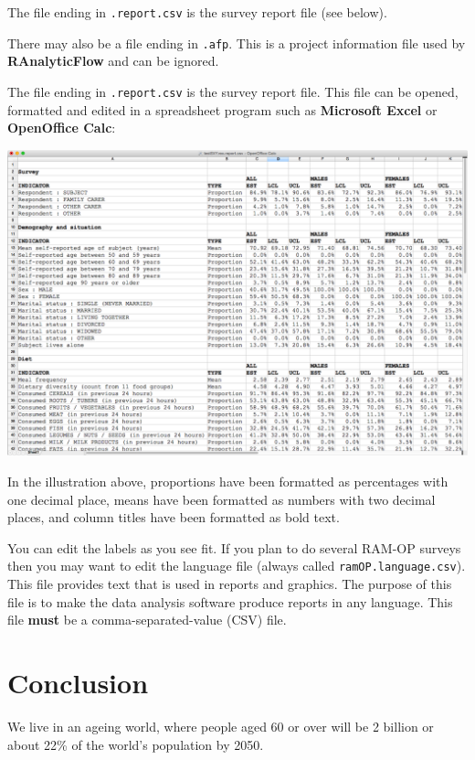 \documentclass[12pt,a4paper]{book}
\theoremstyle{definition}
\theoremstyle{definition}
\theoremstyle{definition}
\theoremstyle{remark}
\begin{document}
The file ending in \texttt{.report.csv} is the survey report file (see
below).

There may also be a file ending in \texttt{.afp}. This is a project
information file used by \textbf{RAnalyticFlow} and can be ignored.

The file ending in \texttt{.report.csv} is the survey report file. This
file can be opened, formatted and edited in a spreadsheet program such
as \textbf{Microsoft Excel} or \textbf{OpenOffice Calc}:

\begin{center}\includegraphics{figures/reportFile} \end{center}

In the illustration above, proportions have been formatted as
percentages with one decimal place, means have been formatted as numbers
with two decimal places, and column titles have been formatted as bold
text.

You can edit the labels as you see fit. If you plan to do several RAM-OP
surveys then you may want to edit the language file (always called
\texttt{ramOP.language.csv}). This file provides text that is used in
reports and graphics. The purpose of this file is to make the data
analysis software produce reports in any language. This file
\textbf{must} be a comma-separated-value (CSV) file.

\hypertarget{conclusion}{%
\chapter{Conclusion}\label{conclusion}}

We live in an ageing world, where people aged 60 or over will be 2
billion or about 22\% of the world's population by 2050.
\end{document}
